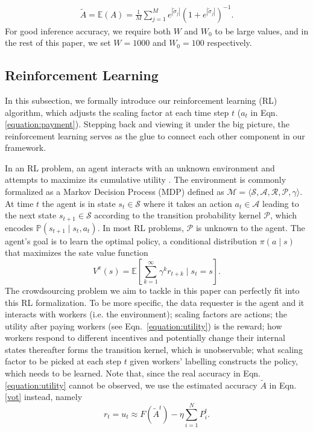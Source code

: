 \begin{equation}
\label{vot}
\begin{split}
\tilde{A}=\mathbb{E}\left(A \right) = \frac{1}{M}{\sum}_{j=1}^{M}e^{|\tilde{\sigma}_j|}\left(1+e^{|\tilde{\sigma}_j|}\right)^{-1}.
\end{split}
\end{equation}
For good inference accuracy, we require both $W$ and $W_0$ to be large values, and in the rest of this paper, we set $W=1000$ and $W_0=100$ respectively.

\subsection{Reinforcement Learning}
In this subsection, we formally introduce our reinforcement learning (RL) algorithm, which adjusts the scaling factor at each time step $t$ ($a_t$ in Eqn.\ref{equation:payment}). Stepping back and viewing it under the big picture, the reinforcement learning serves as the glue to connect each other component in our framework.

In an RL problem, an agent interacts with an unknown environment and attempts to maximize its cumulative utility \citep{Sutton98,Szepesvari10}. The environment is commonly formalized as a Markov Decision Process (MDP) defined as $\mathcal{M} = \langle \mathcal{S}, \mathcal{A}, \mathcal{R}, \mathcal{P}, \gamma\rangle$. At time $t$ the agent is in state $s_t \in \mathcal{S}$ where it takes an action $a_t \in \mathcal{A}$ leading to the next state $s_{t+1} \in \mathcal{S}$ according to the transition probability kernel $\mathcal{P}$, which encodes $\mathbb{P}(s_{t+1}\mid s_t,a_t)$. In most RL problems, $\mathcal{P}$ is unknown to the agent. The agent's goal is to learn the optimal policy, a conditional distribution $\pi(a \mid s)$ that  maximizes the sate value function 
$$
V^\pi(s) = \mathbb{E} \left[ \sum_{k=1}^\infty \gamma^k r_{t+k} \mid s_t = s   \right].
$$
The  crowdsourcing problem we aim to tackle in this paper can perfectly fit into this RL formalization. To be more specific, the data requester is the agent and it interacts with workers (i.e. the environment); scaling factors are actions; %
the utility after paying workers (see Eqn.~\ref{equation:utility}) is the reward; how workers respond to different incentives and potentially change their internal states thereafter forms the transition kernel, which is unobservable; what scaling factor to be picked at each step $t$ given workers' labelling constructs the policy, which needs to be learned.
Note that, since the real accuracy in Eqn.\ref{equation:utility} cannot be observed, we use the estimated accuracy $\tilde{A}$ in Eqn.\ref{vot} instead, namely
$$
r_t=u_t\approx F(\tilde{A}^t) - \eta {\sum}_{i=1}^{N}P^t_i.
$$

